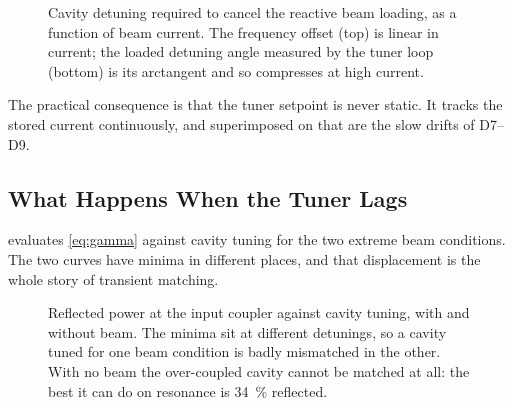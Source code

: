 \begin{figure}[tbp]
\centering
\begin{fitpicture}\end{fitpicture}
\caption{Cavity detuning required to cancel the reactive beam loading, as a function of beam current. The frequency offset (top) is linear in current; the loaded detuning angle measured by the tuner loop (bottom) is its arctangent and so compresses at high current.}\label{fig:detuning-vs-current}
\end{figure}

The practical consequence is that the tuner setpoint is never static. It tracks the stored current continuously, and superimposed on that are the slow drifts of D7--D9.

\subsection{What Happens When the Tuner Lags}\label{sec:transient-lag}


 evaluates \cref{eq:gamma} against cavity tuning for the two extreme beam conditions. The two curves have minima in different places, and that displacement is the whole story of transient matching.

\begin{figure}[tbp]
\centering
\begin{fitpicture}\end{fitpicture}
\caption{Reflected power at the input coupler against cavity tuning, with and without beam. The minima sit at different detunings, so a cavity tuned for one beam condition is badly mismatched in the other. With no beam the over-coupled cavity cannot be matched at all: the best it can do on resonance is \qty{34}{\percent} reflected.}\label{fig:reflected-power}
\end{figure}

